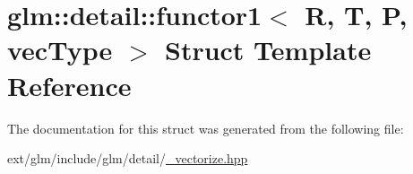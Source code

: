 \hypertarget{structglm_1_1detail_1_1functor1}{\section{glm\-:\-:detail\-:\-:functor1$<$ R, T, P, vec\-Type $>$ Struct Template Reference}
\label{structglm_1_1detail_1_1functor1}
}


The documentation for this struct was generated from the following file\-:\begin{DoxyCompactItemize}
\item 
ext/glm/include/glm/detail/\hyperlink{__vectorize_8hpp}{\-\_\-vectorize.\-hpp}\end{DoxyCompactItemize}

